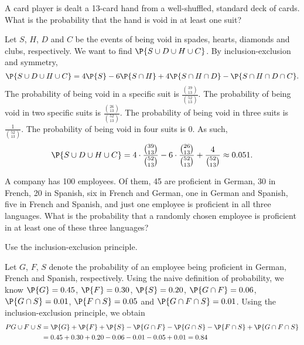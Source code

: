 	\begin{exercise}
		A card player is dealt a 13-card hand from a well-shuffled, standard deck of cards. What is the probability that the hand is void in at least one suit?
		\begin{solution}
			Let $S$, $H$, $D$ and $C$ be the events of being void in spades, hearts, diamonds and clubs, respectively. We want to find $\P{S \cup D \cup H \cup C}$. By inclusion-exclusion and symmetry,
			\begin{equation*}
				\P{S \cup D \cup H \cup C} = 4 \P{S} - 6 \P{S \cap H} + 4 \P{S \cap H \cap D} - \P{S \cap H \cap D \cap C}.
			\end{equation*}
			The probability of being void in a specific suit is $\frac{\binom{39}{13}}{\binom{52}{13}}$. The probability of being void in two specific suits is $\frac{\binom{26}{13}}{\binom{52}{13}}$. The probability of being void in three suits is $\frac{1}{\binom{52}{13}}$. The probability of being void in four suits is 0. As such,
			\begin{equation*}
				\P{S \cup D \cup H \cup C} = 4 \cdot \frac{\binom{39}{13}}{\binom{52}{13}} - 6 \cdot \frac{\binom{26}{13}}{\binom{52}{13}} + \frac{4}{\binom{52}{13}} \approx 0.051.
			\end{equation*}
		\end{solution}
	\end{exercise}
	
	\begin{exercise}
		A company has 100 employees. Of them, 45 are proficient in German, 30 in French, 20 in Spanish, six in French and German, one in German and Spanish, five in French and Spanish, and just one employee is proficient in all three languages. What is the probability that a randomly chosen employee is proficient in at least one of these three languages?
		\begin{hint}
			Use the inclusion-exclusion principle.
		\end{hint}
		\begin{solution}
			Let $G$, $F$, $S$ denote the probability of an employee being proficient in German, French and Spanish, respectively. Using the naive definition of probability, we know $\P{G} = 0.45$, $\P{F} = 0.30$, $\P{S} = 0.20$, $\P{G \cap F} = 0.06$, $\P{G \cap S} = 0.01$, $\P{F \cap S} = 0.05$ and $\P{G \cap F \cap S} = 0.01$. Using the inclusion-exclusion principle, we obtain
			\begin{align*}
				P{G \cup F \cup S} & = \P{G} + \P{F} + \P{S} - \P{G \cap F} - \P{G \cap S} - \P{F \cap S} + \P{G \cap F \cap S} \\
				& = 0.45 + 0.30 + 0.20 - 0.06 - 0.01 - 0.05 + 0.01 = 0.84
			\end{align*}
		\end{solution}
	\end{exercise}



